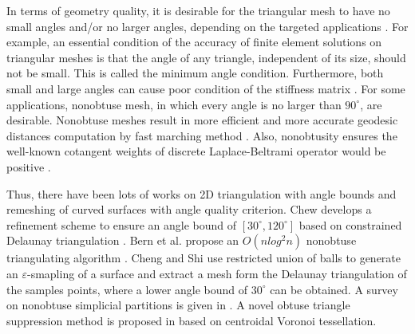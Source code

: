 \documentclass[10pt,journal,cspaper,compsoc]{IEEEtran}
\begin{document}
In terms of geometry quality, it is desirable for the triangular mesh to have no small angles and/or no larger angles, depending on the targeted applications \cite{S2002}. For example, an essential condition of the accuracy of finite element solutions on triangular meshes is that the angle of any triangle, independent of its size, should not be small. This is called the minimum angle condition. Furthermore, both small and large angles can cause poor condition of the stiffness matrix \cite{S2002}. For some applications, nonobtuse mesh, in which every angle is no larger than $90^{\circ}$, are desirable. Nonobtuse meshes result in more efficient and more accurate geodesic distances computation by fast marching method \cite{KS1998}. Also, nonobtusity ensures the well-known cotangent weights of discrete Laplace-Beltrami operator would be positive \cite{WMKG2007}.

Thus, there have been lots of works on 2D triangulation with angle bounds and remeshing of curved surfaces with angle quality criterion. Chew develops a refinement scheme to ensure an angle bound of $[30^{\circ}, 120^{\circ}]$ based on constrained Delaunay triangulation \cite{C1993}. Bern et al. propose an $O(nlog^{2}n)$ nonobtuse triangulating algorithm \cite{BMR1994}. Cheng and Shi \cite{CS2005} use restricted union of balls to generate an $\varepsilon$-smapling of a surface and extract a mesh form the Delaunay triangulation of the samples points, where a lower angle bound of $30^{\circ}$ can be obtained. A survey on nonobtuse simplicial partitions is given in \cite{JKKS2009}. A novel obtuse triangle suppression method is proposed in \cite{SCWYLL2011} based on centroidal Voronoi tessellation.
\end{document}
